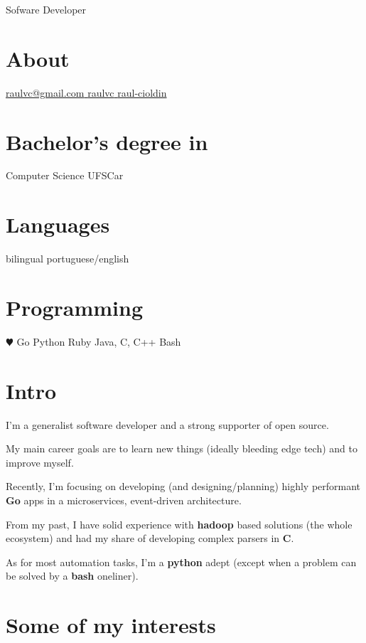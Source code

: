 \documentclass[]{friggeri-cv}
\begin{document}
       {Sofware Developer}


\begin{aside}
  \section{About}        
    \href{mailto:raulvc@gmail.com}{raulvc@gmail.com{\color{gray} \faEnvelope}}
    \href{https://github.com/raulvc}{raulvc{ \faGithub}}
    \href{https://www.linkedin.com/in/raul-cioldin/}{raul-cioldin{ \color{blue!20!black} \faLinkedin}}
  \section{Bachelor's degree in}
	Computer Science
	UFSCar
  \section{Languages}
    bilingual portuguese/english
  \section{Programming}
  	{\color{red} $\varheartsuit$} Go
    Python
    Ruby
	Java, C, C++
	Bash
\end{aside}

\section{Intro}

I'm a generalist software developer and a strong supporter of open source. 

My main career goals are to learn new things (ideally bleeding edge tech) and to improve myself.

Recently, I'm focusing on developing (and designing/planning) highly performant \textbf{Go} apps in a microservices, event-driven architecture.

From my past, I have solid experience with \textbf{hadoop} based solutions (the whole ecosystem) and had my share of developing complex parsers in \textbf{C}. 

As for most automation tasks, I'm a \textbf{python} adept (except when a problem can be solved by a \textbf{bash} oneliner).

\section{Some of my interests}
\end{document}
